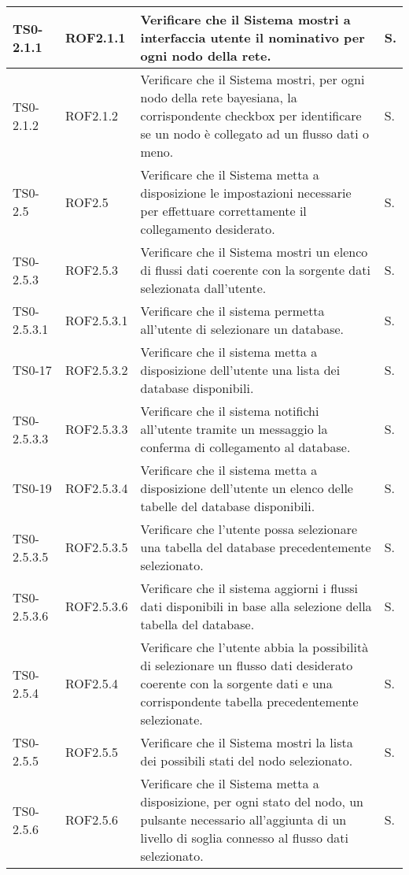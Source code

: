 \begin{longtable}{|C{.15\textwidth}|C{.14\textwidth}|m{.51\textwidth}|C{.08\textwidth}|}
\hline
TS0-2.1.1 & ROF2.1.1 & Verificare che il Sistema mostri a interfaccia utente il nominativo per ogni nodo della rete.& S.\\
\hline
{} TS0-2.1.2 & ROF2.1.2 & Verificare che il Sistema mostri, per ogni nodo della rete bayesiana, la corrispondente checkbox per identificare se un nodo è collegato ad un flusso dati o meno. & S. \\
\hline
TS0-2.5 & ROF2.5 & Verificare che il Sistema metta a disposizione le impostazioni necessarie per effettuare correttamente il collegamento desiderato. & S. \\ 
\hline
{}TS0-2.5.3 & ROF2.5.3 & Verificare che il Sistema mostri un elenco di flussi dati coerente con la sorgente dati selezionata dall'utente. & S. \\
\hline
TS0-2.5.3.1 & ROF2.5.3.1 & Verificare che il sistema permetta all'utente di selezionare un database. & S. \\ 
\hline
{}TS0-17 & ROF2.5.3.2 & Verificare che il sistema metta a disposizione dell'utente una lista dei database disponibili. & S. \\ 
\hline
TS0-2.5.3.3 & ROF2.5.3.3 & Verificare che il sistema notifichi all'utente tramite un messaggio la conferma di collegamento al database. & S. \\
\hline 
{}TS0-19 & ROF2.5.3.4 & Verificare che il sistema metta a disposizione dell'utente un elenco delle tabelle del database disponibili. & S. \\
\hline
TS0-2.5.3.5 & ROF2.5.3.5 & Verificare che l'utente possa selezionare una tabella del database precedentemente selezionato. & S. \\
\hline
{}TS0-2.5.3.6 & ROF2.5.3.6 & Verificare che il sistema aggiorni i flussi dati disponibili in base alla selezione della tabella del database. & S. \\ 
\hline
TS0-2.5.4 & ROF2.5.4 & Verificare che l'utente abbia la possibilità di selezionare un flusso dati desiderato coerente con la sorgente dati e  una corrispondente tabella precedentemente selezionate. & S. \\ 
\hline
{}TS0-2.5.5 & ROF2.5.5 & Verificare che il Sistema mostri la lista dei possibili stati del nodo selezionato. & S. \\ 
\hline
TS0-2.5.6 & ROF2.5.6 & Verificare che il Sistema metta a disposizione, per ogni stato del nodo, un pulsante necessario all'aggiunta di un livello di soglia connesso al flusso dati selezionato. & S. \\

\end{longtable}
